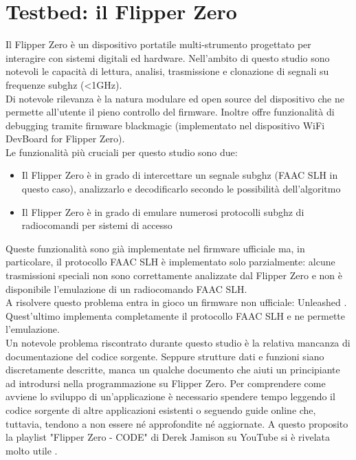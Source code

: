 \chapter{Testbed: il Flipper Zero}
\label{cha:testbed}

Il Flipper Zero è un dispositivo portatile multi-strumento progettato per interagire con sistemi digitali ed hardware. Nell'ambito di questo studio sono notevoli le capacità di lettura, analisi, trasmissione e clonazione di segnali su frequenze subghz (<1GHz).\\
Di notevole rilevanza è la natura modulare ed open source del dispositivo che ne permette all'utente il pieno controllo del firmware. Inoltre offre funzionalità di debugging tramite firmware blackmagic (implementato nel dispositivo WiFi DevBoard for Flipper Zero).\\
Le funzionalità più cruciali per questo studio sono due:
\begin{itemize}
  \item Il Flipper Zero è in grado di intercettare un segnale subghz (FAAC SLH in questo caso), analizzarlo e decodificarlo secondo le possibilità dell'algoritmo
  \item Il Flipper Zero è in grado di emulare numerosi protocolli subghz di radiocomandi per sistemi di accesso
\end{itemize}
Queste funzionalità sono già implementate nel firmware ufficiale \cite{off_firmware} ma, in particolare, il protocollo FAAC SLH è implementato solo parzialmente: alcune trasmissioni speciali non sono correttamente analizzate dal Flipper Zero e non è disponibile l'emulazione di un radiocomando FAAC SLH.\\
A risolvere questo problema entra in gioco un firmware non ufficiale: Unleashed \cite{firmware}. Quest'ultimo implementa completamente il protocollo FAAC SLH e ne permette l'emulazione.\\
Un notevole problema riscontrato durante questo studio è la relativa mancanza di documentazione del codice sorgente. Seppure strutture dati e funzioni siano discretamente descritte, manca un qualche documento che aiuti un principiante ad introdursi nella programmazione su Flipper Zero. Per comprendere come avviene lo sviluppo di un'applicazione è necessario spendere tempo leggendo il codice sorgente di altre applicazioni esistenti o seguendo guide online che, tuttavia, tendono a non essere né approfondite né aggiornate. A questo proposito la playlist "Flipper Zero - CODE" di Derek Jamison su YouTube si è rivelata molto utile \cite{derek}.\\
